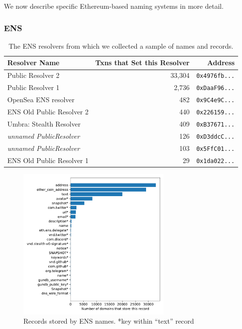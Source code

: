 \documentclass[10pt,sigconf,letterpaper]{acmart}
\begin{document}
We now describe specific Ethereum-based naming systems in more detail.

\subsubsection{ENS}

\begin{table}
	\begin{tabular}{lrr}
		\toprule
		Resolver Name & Txns that Set this Resolver & Address \\
		\midrule 
		Public Resolver 2 & 33,304 & \texttt{0x4976fb...} \\
		Public Resolver 1 & 2,736 & \texttt{0xDaaF96...} \\
		OpenSea ENS resolver & 482 & \texttt{0x9C4e9C...} \\
		ENS Old Public Resolver 2 & 440	& \texttt{0x226159...} \\
		Umbra: Stealth Resolver & 409 & \texttt{0xB37671...} \\
		\textit{unnamed PublicResolver} & 126 & \texttt{0xD3ddcC...} \\
		\textit{unnamed PublicResolver} & 103 & \texttt{0x5FfC01...} \\
		ENS Old Public Resolver 1 & 29 & \texttt{0x1da022...} \\
		\bottomrule
	\end{tabular}
\label{tab:ens_resolvers}
\caption{The ENS resolvers from which we collected a sample of names and 
records.}
\end{table}

\begin{figure}[t]
	\centering
	\includegraphics[width=3in]{figs/ens_names.pdf}
	\caption{Records stored by ENS names. *key within ``text'' record}
	\label{fig:ens_records}
\end{figure}
\end{document}
